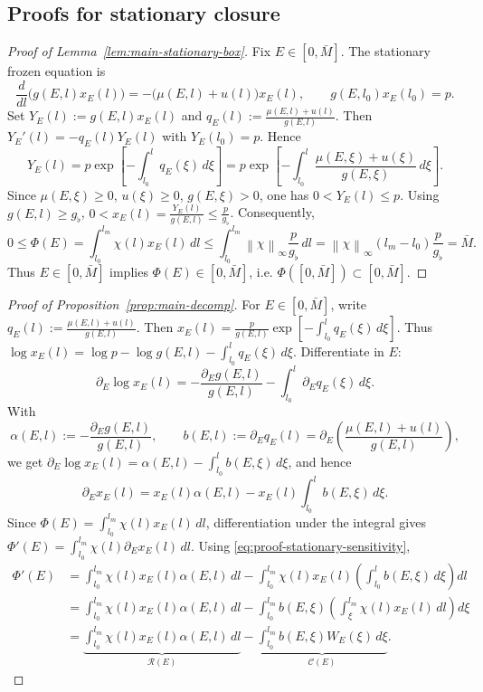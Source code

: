 \documentclass[pdflatex,sn-mathphys-num]{sn-jnl}
\theoremstyle{thmstyleone}
\theoremstyle{definition}
\theoremstyle{remark}
\newcommand{\Rcal}{\mathcal{R}}
\newcommand{\Ccal}{\mathcal{C}}
\newcommand{\norm}[1]{\left\lVert#1\right\rVert}
\numberwithin{equation}{section}
\begin{document}
\subsection{Proofs for stationary closure}
\label{subsec:proof-stationary}
\begin{proof}[Proof of Lemma~\ref{lem:main-stationary-box}]
Fix \(E\in[0,\bar M]\). The stationary frozen equation is
\[
\frac{d}{dl}\big(g(E,l)x_E(l)\big)
=
-\big(\mu(E,l)+u(l)\big)x_E(l),
\qquad
g(E,l_0)x_E(l_0)=p .
\]
Set
$Y_E(l):=g(E,l)x_E(l)$ and
$\displaystyle q_E(l):=\frac{\mu(E,l)+u(l)}{g(E,l)}$.
Then
$Y_E'(l)=-q_E(l)Y_E(l)$ with
$Y_E(l_0)=p$.
Hence
\[
Y_E(l)
=
p\exp\!\left[-\int_{l_0}^{l}q_E(\xi)\,d\xi\right]
=
p\exp\!\left[-\int_{l_0}^{l}
\frac{\mu(E,\xi)+u(\xi)}{g(E,\xi)}\,d\xi\right].
\]
Since
$\mu(E,\xi)\ge0$, $u(\xi)\ge0$, $g(E,\xi)>0$,
one has $0<Y_E(l)\le p$.
Using \(g(E,l)\ge g_\flat\),
$\displaystyle 
0<x_E(l)=\frac{Y_E(l)}{g(E,l)}
\le
\frac{p}{g_\flat}$.
Consequently,
\[
0\le\Phi(E)
=
\int_{l_0}^{l_m}\chi(l)x_E(l)\,dl
\le
\int_{l_0}^{l_m}\norm{\chi}_{\infty}\frac{p}{g_\flat}\,dl
=
\norm{\chi}_{\infty}(l_m-l_0)\frac{p}{g_\flat}
=
\bar M .
\]
Thus
$E\in[0,\bar M]$ implies $\Phi(E)\in[0,\bar M]$, i.e.
$\Phi([0,\bar M])\subset[0,\bar M]$.
\end{proof}
\begin{proof}[Proof of Proposition~\ref{prop:main-decomp}]
For \(E\in[0,\bar M]\), write
$\displaystyle 
q_E(l):=\frac{\mu(E,l)+u(l)}{g(E,l)}$.
Then
$\displaystyle x_E(l)
=
\frac{p}{g(E,l)}
\exp\!\left[-\int_{l_0}^{l}q_E(\xi)\,d\xi\right]$.
Thus
$\displaystyle 
\log x_E(l)
=
\log p-\log g(E,l)-\int_{l_0}^{l}q_E(\xi)\,d\xi$.
Differentiate in \(E\):
\[
\partial_E\log x_E(l)
=
-\frac{\partial_E g(E,l)}{g(E,l)}
-
\int_{l_0}^{l}\partial_E q_E(\xi)\,d\xi .
\]
With
\[
\alpha(E,l):=-\frac{\partial_E g(E,l)}{g(E,l)},
\qquad
b(E,l):=\partial_E q_E(l)
=
\partial_E\left(\frac{\mu(E,l)+u(l)}{g(E,l)}\right),
\]
we get
$\displaystyle 
\partial_E\log x_E(l)
=
\alpha(E,l)-\int_{l_0}^{l}b(E,\xi)\,d\xi$,
and hence
\begin{equation}
\label{eq:proof-stationary-sensitivity}
\partial_E x_E(l)
=
x_E(l)\alpha(E,l)
-
x_E(l)\int_{l_0}^{l}b(E,\xi)\,d\xi .
\end{equation}
Since
$\displaystyle 
\Phi(E)=\int_{l_0}^{l_m}\chi(l)x_E(l)\,dl$,
differentiation under the integral gives
$\displaystyle 
\Phi'(E)
=
\int_{l_0}^{l_m}\chi(l)\partial_E x_E(l)\,dl$.
Using \eqref{eq:proof-stationary-sensitivity},
\[
\begin{aligned}
\Phi'(E)
&=
\int_{l_0}^{l_m}\chi(l)x_E(l)\alpha(E,l)\,dl
-
\int_{l_0}^{l_m}\chi(l)x_E(l)
\left(\int_{l_0}^{l}b(E,\xi)\,d\xi\right)dl\\[4pt]
&=\int_{l_0}^{l_m}\chi(l)x_E(l)\alpha(E,l)\,dl
- \int_{l_0}^{l_m}
b(E,\xi)
\left(
\int_{\xi}^{l_m}\chi(l)x_E(l)\,dl
\right)d\xi\\[4pt]
&=
\underbrace{
\int_{l_0}^{l_m}\chi(l)x_E(l)\alpha(E,l)\,dl
}_{\Rcal(E)}
-
\underbrace{
\int_{l_0}^{l_m}b(E,\xi)W_E(\xi)\,d\xi
}_{\Ccal(E)}.
\end{aligned}
\]
\end{proof}
\end{document}
